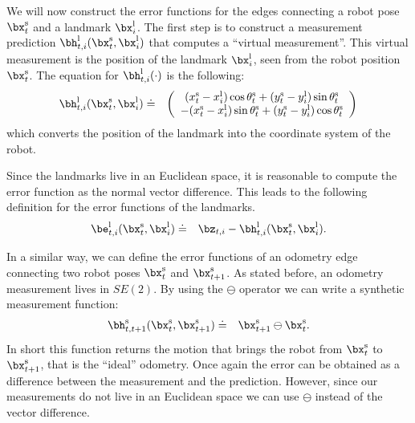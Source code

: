 \documentclass[a4paper]{article}
\begin{document}
We will now construct the error functions for the edges connecting a
robot pose $\bx^\mathrm{s}_t$ and a landmark $\bx^\mathrm{l}_i$.  The
first step is to construct a measurement prediction
$\bh^\mathrm{l}_{t,i}(\bx^\mathrm{s}_t, \bx^\mathrm{l}_i)$ that computes
a ``virtual measurement''. This virtual measurement is the position of
the landmark $\bx^\mathrm{l}_i$, seen from the robot position
$\bx^\mathrm{s}_t$. The equation for $\bh^\mathrm{l}_{t,i}(\cdot)$ is the
following:
\begin{eqnarray}
    \bh^\mathrm{l}_{t,i}(\bx^\mathrm{s}_t, \bx^\mathrm{l}_i)   & \doteq &
    \left(
    \begin{array}{c}
        (x^\mathrm{s}_t - x^\mathrm{l}_i)  \cos \theta^\mathrm{s}_t + (y^\mathrm{s}_t - y^\mathrm{l}_i) \sin \theta^\mathrm{s}_t \\
      - (x^\mathrm{s}_t - x^\mathrm{l}_i)  \sin \theta^\mathrm{s}_t + (y^\mathrm{s}_t - y^\mathrm{l}_i) \cos \theta^\mathrm{s}_t
    \end{array}
    \right)
\end{eqnarray}
which converts the position of the landmark into the coordinate system of
the robot.

Since the landmarks live in an Euclidean space, it is reasonable to
compute the error function as the normal vector difference.  This
leads to the following definition for the error functions of the
landmarks.
\begin{eqnarray}
    \be^\mathrm{l}_{t,i}(\bx^\mathrm{s}_t, \bx^\mathrm{l}_i)   & \doteq & \bz_{t,i} - \bh^\mathrm{l}_{t,i}(\bx^\mathrm{s}_t, \bx^\mathrm{l}_i).
    \label{eq:landmarkError}
\end{eqnarray}

In a similar way, we can define the error functions of an odometry
edge connecting two robot poses $\bx^\mathrm{s}_t$ and
$\bx^\mathrm{s}_{t+1}$. As stated before, an odometry measurement lives in $SE(2)$.
By using the $\ominus$ operator we can write a synthetic measurement function:
\begin{eqnarray}
    \bh^\mathrm{s}_{t,t+1}(\bx^\mathrm{s}_t, \bx^\mathrm{s}_{t+1})   & \doteq & \bx^\mathrm{s}_{t+1} \ominus \bx^\mathrm{s}_{t}.
\end{eqnarray}
In short this function returns the motion that brings the robot from
$\bx^\mathrm{s}_t$ to $\bx^\mathrm{s}_{t+1}$, that is the ``ideal''
odometry.  Once again the error can be obtained as a difference
between the measurement and the prediction. However, since our measurements
do not live in an Euclidean space we can use $\ominus$ instead of the vector difference.
\end{document}
